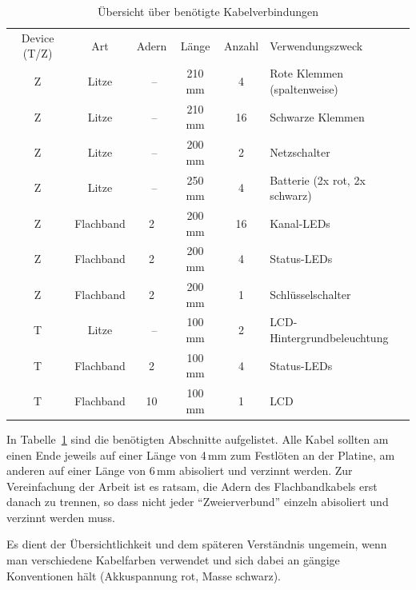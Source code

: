 \documentclass[paper=a4, parskip, numbers=noenddot, toc=listof, headsepline]{scrbook}
\begin{document}
			  \begin{table}
				  \centering
				  \begin{tabularx}{\textwidth}{cccccX}
					  \hline\hline
					  Device (T/Z) & Art       & Adern & Länge  & Anzahl & Verwendungszweck              \\
					  Z            & Litze     & ~--   & 210 mm & 4      & Rote Klemmen (spaltenweise)   \\
					  Z            & Litze     & ~--   & 210 mm & 16     & Schwarze Klemmen              \\
					  Z            & Litze     & ~--   & 200 mm & 2      & Netzschalter                  \\
					  Z            & Litze     & ~--   & 250 mm & 4      & Batterie (2x rot, 2x schwarz) \\
					  Z            & Flachband & 2     & 200 mm & 16     & Kanal-LEDs                    \\
					  Z            & Flachband & 2     & 200 mm & 4      & Status-LEDs                   \\
					  Z            & Flachband & 2     & 200 mm & 1      & Schlüsselschalter             \\ \hline
					  T            & Litze     & ~--   & 100 mm & 2      & LCD-Hintergrundbeleuchtung    \\
					  T            & Flachband & 2     & 100 mm & 4      & Status-LEDs                   \\
					  T            & Flachband & 10    & 100 mm & 1      & LCD                           \\ \hline\hline
				  \end{tabularx}
				  \caption{Übersicht über benötigte Kabelverbindungen}
				  \label{tab:kabel}
			  \end{table}

			  In Tabelle~\ref{tab:kabel} sind die benötigten Abschnitte aufgelistet. Alle Kabel sollten am einen Ende jeweils auf einer Länge von 4\,mm zum Festlöten an der Platine, am anderen auf einer Länge von 6\,mm abisoliert und verzinnt werden. Zur Vereinfachung der Arbeit ist es ratsam, die Adern des Flachbandkabels erst danach zu trennen, so dass nicht jeder \enquote{Zweierverbund} einzeln abisoliert und verzinnt werden muss.

			  Es dient der Übersichtlichkeit und dem späteren Verständnis ungemein, wenn man verschiedene Kabelfarben verwendet und sich dabei an gängige Konventionen hält (Akkuspannung rot, Masse schwarz).
\end{document}
